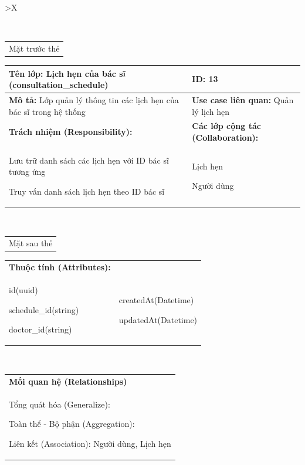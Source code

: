\begin{xltabular}{\textwidth}{
		>{\centering\arraybackslash}X
	}
	\caption{\bfseries \fontsize{12pt}{0pt}\selectfont Thẻ CRC lớp Lịch hẹn của bác sĩ}
	\\
	\begin{tabularx}{0.9\textwidth}{X}
		Mặt trước thẻ
	\end{tabularx}
	\begin{tabularx}{0.9\textwidth}{|X|X|}
		\hline
		\textbf{Tên lớp:} Lịch hẹn của bác sĩ (consultation\_schedule)               & \textbf{ID:} 13                                \\
		\hline
		\textbf{Mô tả:} Lớp quản lý thông tin các lịch hẹn của bác sĩ trong hệ thống & \textbf{Use case liên quan:}  Quản lý lịch hẹn \\
		\hline
		\textbf{Trách nhiệm (Responsibility):}                                       & \textbf{Các lớp cộng tác (Collaboration):}     \\
		Lưu trữ danh sách các lịch hẹn với ID bác sĩ tương ứng

		Truy vấn danh sách lịch hẹn theo ID bác sĩ
		                                                                             &
		Lịch hẹn

		Người dùng
		\\
		\hline
	\end{tabularx}
	\\
	\begin{tabularx}{0.9\textwidth}{X}
		Mặt sau thẻ
	\end{tabularx}
	\begin{tabularx}{0.9\textwidth}{|X|X|}
		\hline
		\textbf{Thuộc tính (Attributes):} & \\
		id(uuid)

		schedule\_id(string)

		doctor\_id(string)
		                                  &
		createdAt(Datetime)

		updatedAt(Datetime)
		\\ \hline
	\end{tabularx}
	\\
	\begin{tabularx}{0.9\textwidth}{|X|}
		\hline
		\textbf{Mối quan hệ (Relationships)} \\
		Tổng quát hóa (Generalize):

		Toàn thể - Bộ phận (Aggregation):

		Liên kết (Association): Người dùng, Lịch hẹn
		\\
		\hline
	\end{tabularx}
\end{xltabular}

